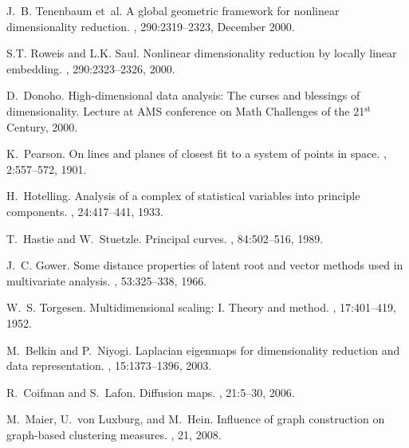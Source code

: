 \documentclass[10pt,twocolumn]{article}
\numberwithin{equation}{section}
\begin{document}
\begin{thebibliography}{10}

J.~B. Tenenbaum et~al.
\newblock A global geometric framework for nonlinear dimensionality reduction.
, 290:2319--2323, December 2000.

S.T. Roweis and L.K. Saul.
\newblock Nonlinear dimensionality reduction by locally linear embedding.
, 290:2323--2326, 2000.

D.~Donoho.
\newblock High-dimensional data analysis: {T}he curses and blessings of
  dimensionality.
\newblock Lecture at AMS conference on Math Challenges of the
  21$^{\textrm{st}}$ Century, 2000.

K.~Pearson.
\newblock On lines and planes of closest fit to a system of points in space.
, 2:557--572, 1901.

H.~Hotelling.
\newblock Analysis of a complex of statistical variables into principle
  components.
, 24:417--441, 1933.

T.~Hastie and W.~Stuetzle.
\newblock Principal curves.
, 84:502--516,
  1989.

J.~C. Gower.
\newblock Some distance properties of latent root and vector methods used in
  multivariate analysis.
, 53:325--338, 1966.

W.~S. Torgesen.
\newblock Multidimensional scaling: {I}. {T}heory and method.
, 17:401--419, 1952.

M.~Belkin and P.~Niyogi.
\newblock Laplacian eigenmaps for dimensionality reduction and data
  representation.
, 15:1373--1396, 2003.

R.~Coifman and S.~Lafon.
\newblock Diffusion maps.
, 21:5--30, 2006.

M.~Maier, U.~von {L}uxburg, and M.~Hein.
\newblock Influence of graph construction on graph-based clustering measures.
, 21, 2008.


\end{thebibliography}
\end{document}
